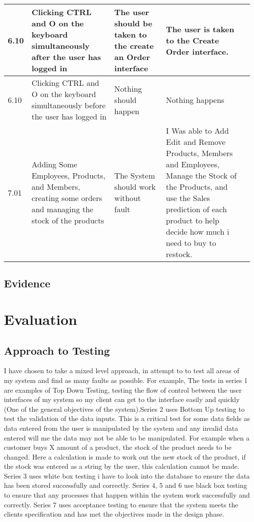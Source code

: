 \begin{flushleft}
\begin{longtable}{|p{1.0cm}|p{2.5cm}|p{3cm}|p{3.0cm}|p{2.5cm}|}
	6.10 & Clicking CTRL and O on the keyboard simultaneously after the user has logged in & The user should be taken to the create an Order interface & The user is taken to the Create Order interface. & \\ \hline
	6.10 & Clicking CTRL and O on the keyboard simultaneously before the user has logged in & Nothing should happen& Nothing happens &  \\ \hline
	7.01 & Adding Some Employees, Products, and Members, creating some orders and managing the stock of the products & The System should work without fault & I Was able to Add Edit and Remove Products, Members and Employees, Manage the Stock of the Products, and use the Sales prediction of each product to help decide how much i need to buy to restock. & \\ \hline
       \end{longtable}
\end{flushleft}
        
        
\subsection{Evidence}

\section{Evaluation}

\subsection{Approach to Testing}

I have chosen to take a mixed level approach, in attempt to to test all areas of my system and find as many faults as possible. For example,  The tests in series 1 are examples of Top Down Testing, testing the flow of control between the user interfaces of my system so my client can get to the interface easily and quickly (One of the general objectives of the system).Series 2 uses Bottom Up testing to test the validation of the data inputs. This is a critical test for some data fields as data entered from the user is manipulated by the system and any invalid data entered will me the data may not be able to be manipulated. For example when a customer buys X amount of a product, the stock of the product needs to be changed. Here a calculation is made to work out the new stock of the product, if the stock was entered as a string by the user, this calculation cannot be made. Series 3 uses white box testing i have to look into the database to ensure the data has been stored successfully and correctly. Series 4, 5 and 6 use black box testing to ensure that any processes that happen within the system work successfully and correctly. Series 7 uses acceptance testing to ensure that the system meets the clients specification and has met the objectives made in the design phase.

